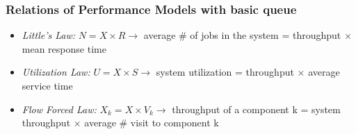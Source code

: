 \subsubsection{Relations of Performance Models with basic queue}
\begin{itemize}
    \item \textit{Little’s Law:} \(N = X \times R \rightarrow\) average \# of jobs in the system = throughput \(\times\) mean response time
    \item \textit{Utilization Law:} \(U = X \times S \rightarrow\) system utilization = throughput \(\times\) average service time
    \item \textit{Flow Forced Law:} \(X_k = X \times V_k \rightarrow\) throughput of a component k = system throughput \(\times\) average \# visit to component k
\end{itemize}